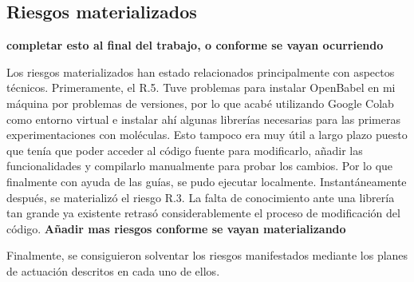 \subsection{Riesgos materializados}\label{riesgos_materializados}

\textbf{completar esto al final del trabajo, o conforme se vayan ocurriendo}


Los riesgos materializados han estado relacionados principalmente con aspectos técnicos. Primeramente, el R.5. Tuve problemas para instalar OpenBabel en mi máquina por problemas de versiones, por lo que acabé utilizando Google Colab como entorno virtual e instalar ahí algunas librerías necesarias para las primeras experimentaciones con moléculas. Esto tampoco era muy útil a largo plazo puesto que tenía que poder acceder al código fuente para modificarlo, añadir las funcionalidades y compilarlo manualmente para probar los cambios. Por lo que finalmente con ayuda de las guías, se pudo ejecutar localmente. Instantáneamente después, se materializó el riesgo R.3. La falta de conocimiento ante una librería tan grande ya existente retrasó considerablemente el proceso de modificación del código. 
\textbf{Añadir mas riesgos conforme se vayan materializando}

Finalmente, se consiguieron solventar los riesgos manifestados mediante los planes de actuación descritos en cada uno de ellos.
